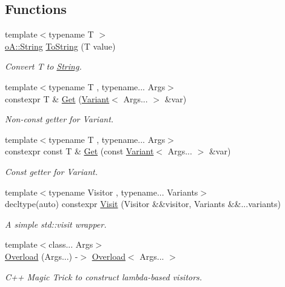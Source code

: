 \subsection*{Functions}
\begin{DoxyCompactItemize}
\item 
{\footnotesize template$<$typename T $>$ }\\\mbox{\hyperlink{classo_a_1_1_string}{o\+A\+::\+String}} \mbox{\hyperlink{namespaceo_a_ab2db5fe904e4be44ffb651930b97d482}{To\+String}} (T value)
\begin{DoxyCompactList}\small\item\em Convert T to \mbox{\hyperlink{classo_a_1_1_string}{String}}. \end{DoxyCompactList}\item 
{\footnotesize template$<$typename T , typename... Args$>$ }\\constexpr T \& \mbox{\hyperlink{namespaceo_a_ad005adf81258b6620b273f6b58be4a42}{Get}} (\mbox{\hyperlink{namespaceo_a_a46a1498e4e673b19327a24fac0018867}{Variant}}$<$ Args... $>$ \&var)
\begin{DoxyCompactList}\small\item\em Non-\/const getter for Variant. \end{DoxyCompactList}\item 
{\footnotesize template$<$typename T , typename... Args$>$ }\\constexpr const T \& \mbox{\hyperlink{namespaceo_a_a1d74fafe5226bbc3bc4bcb41f6f24113}{Get}} (const \mbox{\hyperlink{namespaceo_a_a46a1498e4e673b19327a24fac0018867}{Variant}}$<$ Args... $>$ \&var)
\begin{DoxyCompactList}\small\item\em Const getter for Variant. \end{DoxyCompactList}\item 
{\footnotesize template$<$typename Visitor , typename... Variants$>$ }\\decltype(auto) constexpr \mbox{\hyperlink{namespaceo_a_a020a0189fb201e2160c2959ddbe0bb7f}{Visit}} (Visitor \&\&visitor, Variants \&\&...variants)
\begin{DoxyCompactList}\small\item\em A simple std\+::visit wrapper. \end{DoxyCompactList}\item 
{\footnotesize template$<$class... Args$>$ }\\\mbox{\hyperlink{namespaceo_a_a503e8d88dbf13dedc19801dafc632979}{Overload}} (Args...) -\/$>$ \mbox{\hyperlink{structo_a_1_1_overload}{Overload}}$<$ Args... $>$
\begin{DoxyCompactList}\small\item\em C++ Magic Trick to construct lambda-\/based visitors. \end{DoxyCompactList}\end{DoxyCompactItemize}
